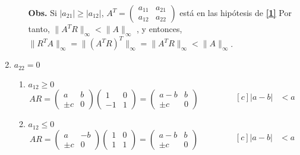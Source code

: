 \documentclass{article}
\newcommand\tab[1][0.6cm]{\hspace*{#1}}
\newcommand\nl{\newline\tab}
\begin{document}
\begin{enumerate}
\begin{enumerate}
			
			\textbf{Obs.} \nl  Si $|a_{21}| \geq |a_{12}|$, 
			$
			A^T = 
			\begin{pmatrix}
			a_{11} & a_{21} \\
			a_{12} & a_{22} 
			\end{pmatrix} $ 
			está en las hipótesis de \textbf{\ref{1}}\nl		
			Por tanto,
			$
			\| A^TR \|_\infty < \|A\|_\infty 
			$
			, y entonces,
			$ \| R^TA \|_\infty = \| \left( A^TR\right) ^T \|_\infty = \| A^TR \|_\infty < \|A\|_\infty 
			$.\nl
			
			
			\end{enumerate}	
		\item $a_{22} = 0$
			\begin{enumerate}
				\item $a_{12} \geq 0$\nl
				$$AR = 
				\begin{pmatrix}
					a & b \\
					\pm c & 0 
				\end{pmatrix} 
				\begin{pmatrix}
					1 & 0 \\
					-1 & 1 
				\end{pmatrix} = 
				\begin{pmatrix}
					a-b & b \\
					\pm c & 0 
				\end{pmatrix}
				\qquad\qquad
				\begin{aligned}[c]
					|a - b| &< a\\
				\end{aligned}
				$$
				\item $a_{12} \leq 0$\nl
				$$AR = 
				\begin{pmatrix}
				a & -b \\
				\pm c & 0 
				\end{pmatrix} 
				\begin{pmatrix}
				1 & 0 \\
				1 & 1 
				\end{pmatrix} = 
				\begin{pmatrix}
				a-b & b \\
				\pm c & 0 
				\end{pmatrix}
				\qquad\qquad
				\begin{aligned}[c]
				|a - b| &< a\\
				\end{aligned}
				$$\nl
			\end{enumerate}
	\end{enumerate}			
\end{document}

